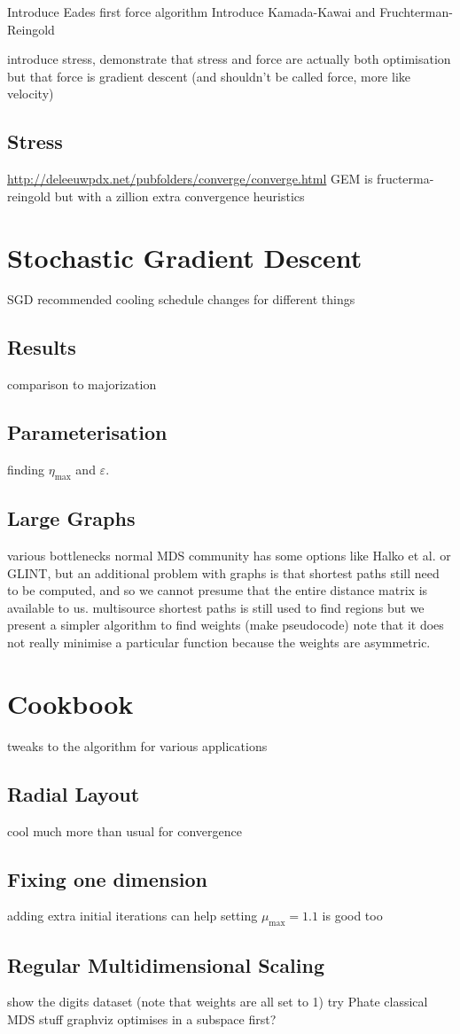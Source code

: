 Introduce Eades first force algorithm
Introduce Kamada-Kawai and Fruchterman-Reingold

introduce stress, demonstrate that stress and force are actually both optimisation but that force is gradient descent (and shouldn't be called force, more like velocity)
\subsection{Stress}
\url{http://deleeuwpdx.net/pubfolders/converge/converge.html}
GEM is fructerma-reingold but with a zillion extra convergence heuristics

\section{Stochastic Gradient Descent}
SGD
recommended cooling schedule changes for different things
\subsection{Results}
comparison to majorization
\subsection{Parameterisation}
finding $\eta_{\max}$ and $\varepsilon$.
\subsection{Large Graphs}
various bottlenecks
normal MDS community has some options like Halko et al. or GLINT, but an additional problem with graphs is that shortest paths still need to be computed, and so we cannot presume that the entire distance matrix is available to us.
multisource shortest paths is still used to find regions
but we present a simpler algorithm to find weights (make pseudocode)
note that it does not really minimise a particular function because the weights are asymmetric.

\section{Cookbook}
tweaks to the algorithm for various applications
\subsection{Radial Layout}
cool much more than usual for convergence
\subsection{Fixing one dimension}
adding extra initial iterations can help
setting $\mu_{\max}=1.1$ is good too
\subsection{Regular Multidimensional Scaling}
show the digits dataset (note that weights are all set to 1)
try Phate classical MDS stuff
graphviz optimises in a subspace first?